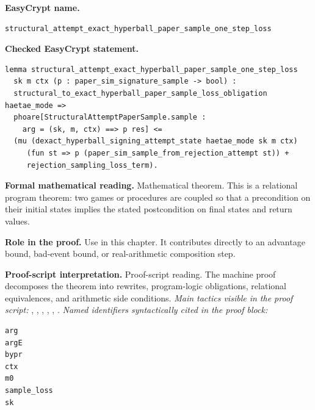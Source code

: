 \begin{formaltheorem}
\noindent\textbf{EasyCrypt name.}
\begin{lstlisting}[language=EasyCrypt,basicstyle=\ttfamily\scriptsize]
structural_attempt_exact_hyperball_paper_sample_one_step_loss
\end{lstlisting}
\noindent\textbf{Checked EasyCrypt statement.}
\begin{lstlisting}[language=EasyCrypt,basicstyle=\ttfamily\scriptsize]
lemma structural_attempt_exact_hyperball_paper_sample_one_step_loss
  sk m ctx (p : paper_sim_signature_sample -> bool) :
  structural_to_exact_hyperball_paper_sample_loss_obligation haetae_mode =>
  phoare[StructuralAttemptPaperSample.sample :
    arg = (sk, m, ctx) ==> p res] <=
  (mu (dexact_hyperball_signing_attempt_state haetae_mode sk m ctx)
     (fun st => p (paper_sim_sample_from_rejection_attempt st)) +
     rejection_sampling_loss_term).
\end{lstlisting}
\noindent\textbf{Formal mathematical reading.}
Mathematical theorem. This is a relational program theorem: two games or procedures are coupled so that a precondition on their initial states implies the stated postcondition on final states and return values.

\noindent\textbf{Role in the proof.}
Use in this chapter. It contributes directly to an advantage bound, bad-event bound, or real-arithmetic composition step.

\noindent\textbf{Proof-script interpretation.}
Proof-script reading. The machine proof decomposes the theorem into rewrites, program-logic obligations, relational equivalences, and arithmetic side conditions.
\emph{Main tactics visible in the proof script:} , , , , , .
\emph{Named identifiers syntactically cited in the proof block:}
\begin{lstlisting}[language=EasyCrypt,basicstyle=\ttfamily\scriptsize]
arg
argE
bypr
ctx
m0
sample_loss
sk
\end{lstlisting}

\end{formaltheorem}


